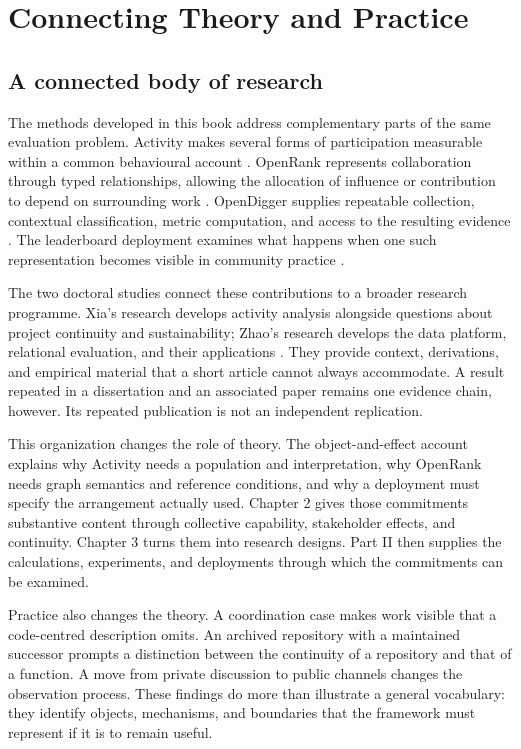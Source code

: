 \section{Connecting Theory and Practice}
\label{sec:intervention}
\label{sec:ch1-theory-practice}

\subsection{A connected body of research}
The methods developed in this book address complementary parts of the same evaluation problem. Activity makes several forms of participation measurable within a common behavioural account \citep{xia2022}. OpenRank represents collaboration through typed relationships, allowing the allocation of influence or contribution to depend on surrounding work \citep{han2026rank}. OpenDigger supplies repeatable collection, contextual classification, metric computation, and access to the resulting evidence \citep{wang2026digger}. The leaderboard deployment examines what happens when one such representation becomes visible in community practice \citep{zhao2024}.

The two doctoral studies connect these contributions to a broader research programme. Xia's research develops activity analysis alongside questions about project continuity and sustainability; Zhao's research develops the data platform, relational evaluation, and their applications \citep{xia2024thesis,zhao2025thesis}. They provide context, derivations, and empirical material that a short article cannot always accommodate. A result repeated in a dissertation and an associated paper remains one evidence chain, however. Its repeated publication is not an independent replication.

This organization changes the role of theory. The object-and-effect account explains why Activity needs a population and interpretation, why OpenRank needs graph semantics and reference conditions, and why a deployment must specify the arrangement actually used. Chapter 2 gives those commitments substantive content through collective capability, stakeholder effects, and continuity. Chapter 3 turns them into research designs. Part II then supplies the calculations, experiments, and deployments through which the commitments can be examined.

Practice also changes the theory. A coordination case makes work visible that a code-centred description omits. An archived repository with a maintained successor prompts a distinction between the continuity of a repository and that of a function. A move from private discussion to public channels changes the observation process. These findings do more than illustrate a general vocabulary: they identify objects, mechanisms, and boundaries that the framework must represent if it is to remain useful.


